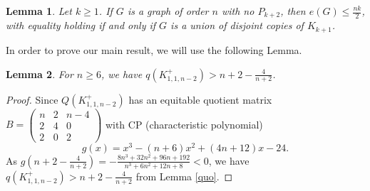\documentclass[12pt]{article}
\newtheorem {lemma}{Lemma}[section]
\begin{document}
\begin{lemma}\label{p5}\cite{PE}
Let $k \ge 1$. If $G$ is a graph of order $n$ with no $P_{k+2}$, then $e(G)\le \frac{nk}{2}$, with equality holding if and only if $G$ is a union of disjoint copies of $K_{k+1}$.
\end{lemma}






In order to prove our main result, we will use the following Lemma.
\begin{lemma}\label{712}
For $n\ge 6$, we have $q(K_{1,1,n-2}^+)>n+2-\frac{4}{n+2}$.
\end{lemma}
\begin{proof}
Since $Q(K_{1,1,n-2}^+)$ has an equitable quotient matrix
$
B=
\left(\begin{smallmatrix}
n &  2  & n-4  \\
2 & 4  &  0  \\
2 &  0  &  2
\end{smallmatrix}\right)$
with CP (characteristic polynomial)
\[
g(x)=x^3-\left(n+6\right)x^2+\left(4n+12\right)x-24.
\]
As $g\left(n+2-\frac{4}{n+2}\right)=-\frac{8n^3+32n^2+96n+192}{n^3+6n^2+12n+8}<0$,
we have $q(K_{1,1,n-2}^+)>n+2-\frac{4}{n+2}$ from Lemma \ref{quo}.
\end{proof}
\end{document}
